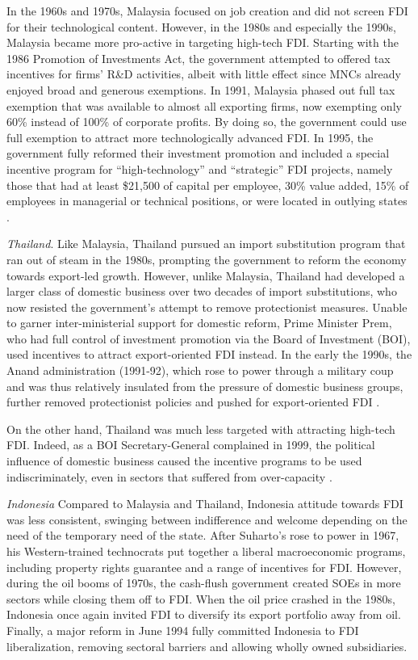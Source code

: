 In the 1960s and 1970s, Malaysia focused on job creation and did not screen FDI
for their technological content. However, in the 1980s and especially the 1990s,
Malaysia became more pro-active in targeting high-tech FDI. Starting with the
1986 Promotion of Investments Act, the government attempted to offered tax
incentives for firms' R\&D activities, albeit with little effect since MNCs
already enjoyed broad and generous exemptions. In 1991, Malaysia phased out full
tax exemption that was available to almost all exporting firms, now exempting
only 60\% instead of 100\% of corporate profits. By doing so, the government
could use full exemption to attract more technologically advanced FDI. In 1995,
the government fully reformed their investment promotion and included a special
incentive program for ``high-technology'' and ``strategic'' FDI projects, namely
those that had at least \$21,500 of capital per employee, 30\% value added, 15\%
of employees in managerial or technical positions, or were located in outlying
states \citep{Felker2001}.

\textit{Thailand}. Like Malaysia, Thailand pursued an import substitution
program that ran out of steam in the 1980s, prompting the government to reform
the economy towards export-led growth. However, unlike Malaysia, Thailand had
developed a larger class of domestic business over two decades of import
substitutions, who now resisted the government's attempt to remove protectionist
measures. Unable to garner inter-ministerial support for domestic reform, Prime
Minister Prem, who had full control of investment promotion via the Board of
Investment (BOI), used incentives to attract export-oriented FDI instead. In the early
the 1990s, the Anand administration (1991-92), which rose to power through a
military coup and was thus relatively insulated from the pressure of domestic
business groups, further removed protectionist policies and pushed for
export-oriented FDI \citep{Felker2001}.

On the other hand, Thailand was much less targeted with attracting high-tech
FDI. Indeed, as a BOI Secretary-General complained in 1999, the political
influence of domestic business caused the incentive programs to be used
indiscriminately, even in sectors that suffered from over-capacity
\citep[90]{Felker2003}.

\textit{Indonesia} Compared to Malaysia and Thailand, Indonesia attitude towards
FDI was less consistent, swinging between indifference and welcome depending on
the need of the temporary need of the state. After Suharto's rose to power in
1967, his Western-trained technocrats put together a liberal macroeconomic
programs, including property rights guarantee and a range of incentives for FDI.
However, during the oil booms of 1970s, the cash-flush government created SOEs
in more sectors while closing them off to FDI. When the oil price crashed in the
1980s, Indonesia once again invited FDI to diversify its export portfolio away
from oil. Finally, a major reform in June 1994 fully committed Indonesia to FDI
liberalization, removing sectoral barriers and allowing wholly owned
subsidiaries.

